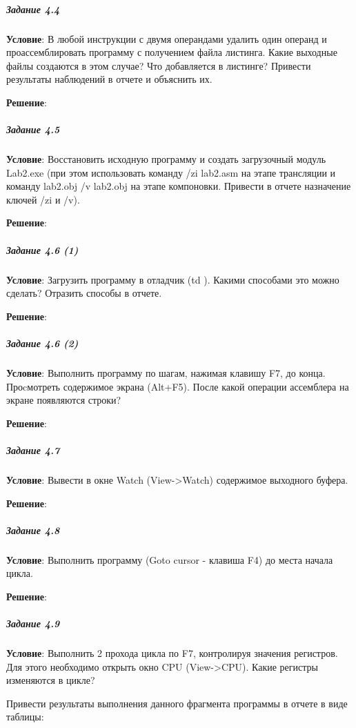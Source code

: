 \subparagraph{Задание 4.4}

\textbf{Условие}:
В любой инструкции с двумя операндами удалить один операнд и проассемблировать программу с получением файла листинга. Какие выходные файлы создаются в этом случае? Что добавляется в листинге? Привести результаты наблюдений в отчете и объяснить их.

\textbf{Решение}:



\subparagraph{Задание 4.5}

\textbf{Условие}:
Восстановить исходную программу и создать загрузочный модуль Lab2.exe (при этом использовать команду  /zi lab2.asm на этапе трансляции и команду lab2.obj  /v lab2.obj на этапе компоновки. Привести в отчете назначение ключей /zi и /v).

\textbf{Решение}:



\subparagraph{Задание 4.6 (1)}

\textbf{Условие}:
Загрузить программу в отладчик (td ). Какими способами это можно сделать? Отразить способы в отчете.

\textbf{Решение}:



\subparagraph{Задание 4.6 (2)}

\textbf{Условие}:
Выполнить программу по шагам, нажимая клавишу F7, до конца. Проcмотреть содержимое экрана (Alt+F5). После какой операции ассемблера на экране появляются строки?
 
\textbf{Решение}:



\subparagraph{Задание 4.7}

\textbf{Условие}:
Вывести в окне Watch (View->Watch) содержимое выходного буфера. 

\textbf{Решение}:



\subparagraph{Задание 4.8}

\textbf{Условие}:
Выполнить программу (Goto cursor - клавиша F4) до места начала цикла. 

\textbf{Решение}:



\subparagraph{Задание 4.9}

\textbf{Условие}:
Выполнить 2 прохода цикла по F7, контролируя значения регистров. Для этого необходимо открыть окно CPU (View->CPU). Какие регистры изменяются в цикле?

Привести результаты выполнения данного фрагмента программы в отчете в виде таблицы:

